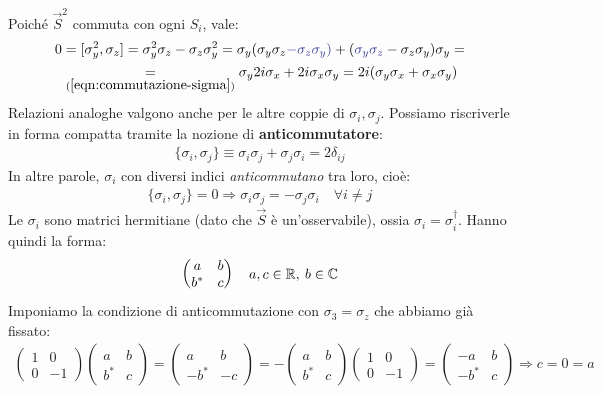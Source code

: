 \documentclass[../../FisicaTeorica.tex]{subfiles}
\begin{document}
Poiché $\vec{S}^2$ commuta con ogni $S_i$, vale:
\begin{align*}
0 &= [\sigma_y^2, \sigma_z]=\sigma_y^2 \sigma_z - \sigma_z \sigma_y^2 = \sigma_y(\sigma_y\sigma_z \textcolor{Blue}{- \sigma_z \sigma_y)} + (\textcolor{Blue}{\sigma_y \sigma_z} -\sigma_z \sigma_y) \sigma_y =\\
&\underset{(\ref{eqn:commutazione-sigma})}{=}\sigma_y 2i \sigma_x + 2i \sigma_x \sigma_y = 2i(\sigma_y \sigma_x + \sigma_x \sigma_y) 
\end{align*}
Relazioni analoghe valgono anche per le altre coppie di $\sigma_i, \sigma_j$. Possiamo riscriverle in forma compatta tramite la nozione di \textbf{anticommutatore}:
\begin{align}
\{\sigma_i, \sigma_j\} \equiv \sigma_i \sigma_j + \sigma_j \sigma_i = 2\delta_{ij}
\label{eqn:relazioni-anticommutazione}
\end{align}
In altre parole, $\sigma_i$ con diversi indici \textit{anticommutano} tra loro, cioè:
\begin{align*}
\{\sigma_i, \sigma_j\} = 0 \Rightarrow \sigma_i \sigma_j = -\sigma_j\sigma_i \quad \forall i\neq j
\end{align*}
Le $\sigma_i$ sono matrici hermitiane (dato che $\vec{S}$ è un'osservabile), ossia $\sigma_i = \sigma_i^\dag$. Hanno quindi la forma:
\[
\begin{pmatrix}
a & b\\
b^* & c
\end{pmatrix}\quad a,c\in \mathbb{R},\> b\in \mathbb{C}
\]
Imponiamo la condizione di anticommutazione con $\sigma_3 = \sigma_z$ che abbiamo già fissato:
\begin{align*}
\begin{pmatrix}
1 & 0\\
0 & -1
\end{pmatrix} \begin{pmatrix}
a & b\\
b^* & c
\end{pmatrix} =
\begin{pmatrix}
a & b\\
-b^* & -c
\end{pmatrix} =-
\begin{pmatrix}
a & b\\
b^* & c
\end{pmatrix}
\begin{pmatrix}
1 & 0\\
0& -1
\end{pmatrix} =
\begin{pmatrix}
-a & b\\
-b^* & c
\end{pmatrix} \Rightarrow c=0=a
\end{align*}
\end{document}

